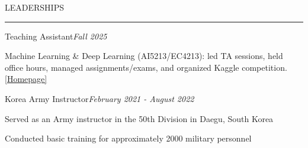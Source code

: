 \documentclass{resume} %
\renewenvironment{rSection}[1]{
\vspace{-0.5 em} %
\sectionskip
\textcolor{RoyalPurple}{\MakeUppercase{#1}}
\sectionlineskip
\hrule
\begin{list}{}{
\setlength{\leftmargin}{1.5em}
}
\item[]
}{
\end{list}
}
\begin{document}
\begin{rSection}{Leaderships}

\begin{rSubsection}{Teaching Assistant}{\em Fall 2025}{}{}
\vspace{-0.3 em}
\item Machine Learning \& Deep Learning (AI5213/EC4213): led TA sessions, held office hours, managed assignments/exams, and organized Kaggle competition. \href{https://sundong.kim/courses/mldl25f/}{[Homepage]}
\end{rSubsection}

\vspace{-0.75 em}

\begin{rSubsection}{Korea Army Instructor}{\em February 2021 - August 2022}{}{}
\vspace{-0.3 em}
\item Served as an Army instructor in the 50th Division in Daegu, South Korea
\item Conducted basic training for approximately 2000 military personnel 
\end{rSubsection}

\end{rSection}



\end{document}
